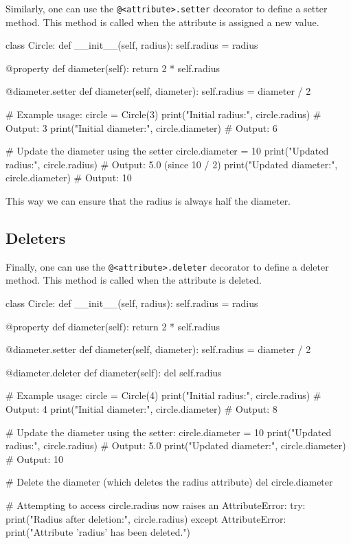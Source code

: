Similarly, one can use the \texttt{@<attribute>.setter} decorator to define a setter method. This method is called when the attribute is assigned a new value.

\begin{codeblock}[language=Python]
    class Circle:
    def __init__(self, radius):
        self.radius = radius

    @property
    def diameter(self):
        return 2 * self.radius

    @diameter.setter
    def diameter(self, diameter):
        self.radius = diameter / 2

# Example usage:
circle = Circle(3)
print("Initial radius:", circle.radius)      # Output: 3
print("Initial diameter:", circle.diameter)    # Output: 6

# Update the diameter using the setter
circle.diameter = 10
print("Updated radius:", circle.radius)        # Output: 5.0 (since 10 / 2)
print("Updated diameter:", circle.diameter)      # Output: 10

\end{codeblock}

This way we can ensure that the radius is always half the diameter.

\subsection*{Deleters}

Finally, one can use the \texttt{@<attribute>.deleter} decorator to define a deleter method. This method is called when the attribute is deleted.

\begin{codeblock}[language=Python]
    class Circle:
    def __init__(self, radius):
        self.radius = radius

    @property
    def diameter(self):
        return 2 * self.radius

    @diameter.setter
    def diameter(self, diameter):
        self.radius = diameter / 2

    @diameter.deleter
    def diameter(self):
        del self.radius

# Example usage:
circle = Circle(4)
print("Initial radius:", circle.radius)      # Output: 4
print("Initial diameter:", circle.diameter)    # Output: 8

# Update the diameter using the setter:
circle.diameter = 10
print("Updated radius:", circle.radius)        # Output: 5.0
print("Updated diameter:", circle.diameter)      # Output: 10

# Delete the diameter (which deletes the radius attribute)
del circle.diameter

# Attempting to access circle.radius now raises an AttributeError:
try:
    print("Radius after deletion:", circle.radius)
except AttributeError:
    print("Attribute 'radius' has been deleted.")

\end{codeblock}


